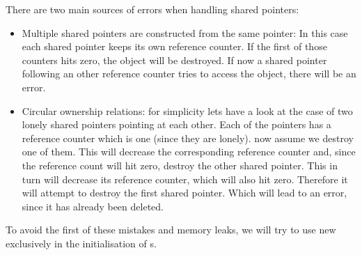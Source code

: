 There are two main sources of errors when handling shared pointers:
\begin{itemize}
\item Multiple shared pointers are constructed from the same pointer: In this case each shared pointer keeps its own reference counter. If the first of those counters hits zero, the object will be destroyed. If now a shared pointer following an other reference counter tries to access the object, there will be an error.
\item Circular ownership relations: for simplicity lets have a look at the case of two lonely shared pointers pointing at each other. Each of the pointers has a reference counter which is one (since they are lonely). now assume we destroy one of them. This will decrease the corresponding reference counter and, since the reference count will hit zero, destroy the other shared pointer. This in turn will decrease its reference counter, which will also hit zero. Therefore it will attempt to destroy the first shared pointer. Which will lead to an error, since it has already been deleted.
\end{itemize}
To avoid the first of these mistakes and memory leaks, we will try to use new exclusively in the initialisation of s.